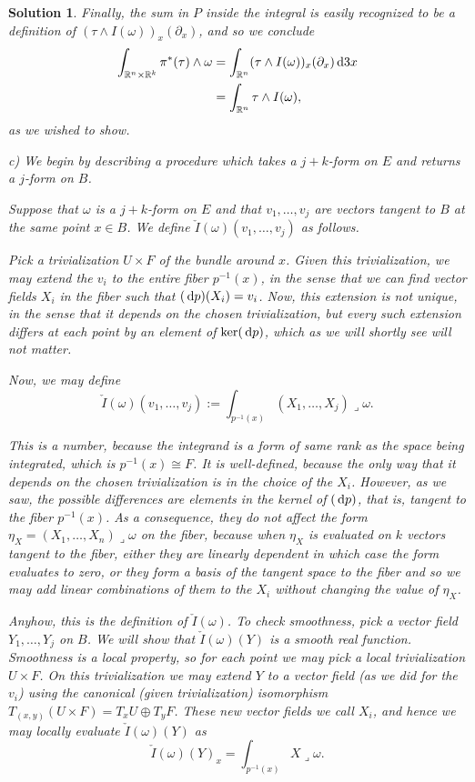 \documentclass{article}
\theoremstyle{nonumberplain}
\newtheorem{sol}{Solution}
\newcommand{\R}{\mathbb{R}}
\newcommand{\into}{\mathbin{\lrcorner}}
\begin{document}
\begin{sol}
Finally, the sum in $P$ inside the integral is easily recognized to be a definition of $(\tau \wedge I(\omega))_x(\partial_x)$, and so we conclude
\begin{align*}
\int_{\R^n \times \R^k} \pi^*(\tau) \wedge \omega &= \int_{\R^n} (\tau \wedge I(\omega))_x(\partial_x) \dl3 x\\
&= \int_{\R^n} \tau \wedge I(\omega),
\end{align*}
as we wished to show.

\medskip

c) We begin by describing a procedure which takes a $j+k$-form on $E$ and returns a $j$-form on $B$.

Suppose that $\omega$ is a $j+k$-form on $E$ and that $v_1, \dots, v_j$ are vectors tangent to $B$ at the same point $x \in B$. We define $\check I(\omega)(v_1, \dots, v_j)$ as follows.

Pick a trivialization $U \times F$ of the bundle around $x$. Given this trivialization, we may extend the $v_i$ to the entire fiber $p^{-1}(x)$, in the sense that we can find vector fields $X_i$ in the fiber such that $(\dl p)(X_i) = v_i$. Now, this extension is not unique, in the sense that it depends on the chosen trivialization, but every such extension differs at each point by an element of $\ker (\dl p)$, which as we will shortly see will not matter.

Now, we may define
\[\check I(\omega)(v_1, \dots, v_j) := \int_{p^{-1}(x)} (X_1, \dots, X_j) \into \omega.\]

This is a number, because the integrand is a form of same rank as the space being integrated, which is $p^{-1}(x) \cong F$. It is well-defined, because the only way that it depends on the chosen trivialization is in the choice of the $X_i$. However, as we saw, the possible differences are elements in the kernel of $(\dl p)$, that is, tangent to the fiber $p^{-1}(x)$. As a consequence, they do not affect the form $\eta_X = (X_1, \dots, X_n) \into \omega$ on the fiber, because when $\eta_X$ is evaluated on $k$ vectors tangent to the fiber, either they are linearly dependent in which case the form evaluates to zero, or they form a basis of the tangent space to the fiber and so we may add linear combinations of them to the $X_i$ without changing the value of $\eta_X$.

Anyhow, this is the definition of $\check I(\omega)$. To check smoothness, pick a vector field $Y_1, \dots, Y_j$ on $B$. We will show that $\check I(\omega)(Y)$ is a smooth real function. Smoothness is a local property, so for each point we may pick a local trivialization $U \times F$. On this trivialization we may extend $Y$ to a vector field (as we did for the $v_i$) using the canonical (given trivialization) isomorphism $T_{(x,y)}(U \times F) = T_x U \oplus T_y F$. These new vector fields we call $X_i$, and hence we may locally evaluate $\check I(\omega)(Y)$ as
\[\check I(\omega)(Y)_x = \int_{p^{-1}(x)} X \into \omega.\]


\end{sol}
\end{document}
